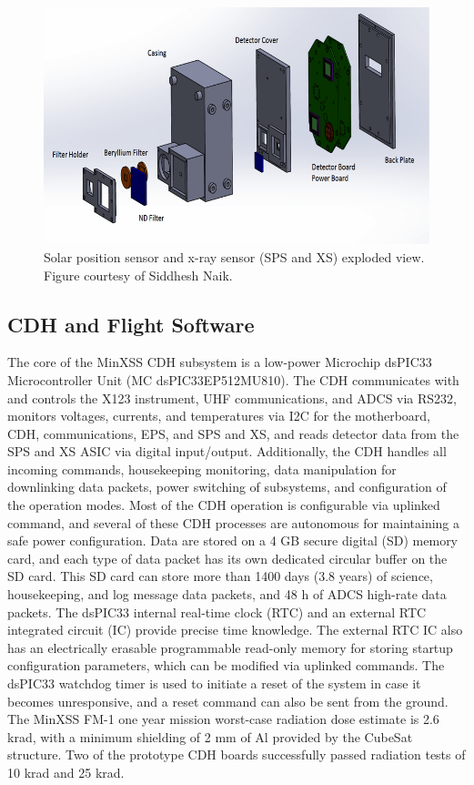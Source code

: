 \begin{figure}[!h]
    \begin{center}
	    \includegraphics[width=\textwidth]{Images/SpsExploded.png}
    \end{center}
    \caption[SPS and XS exploded view]{
        Solar position sensor and x-ray sensor (SPS and XS) exploded view. Figure courtesy of Siddhesh Naik. 
    }
    \label{fig:spsexploded}
\end{figure}

\subsection{CDH and Flight Software}
The core of the MinXSS CDH subsystem is a low-power Microchip dsPIC33 Microcontroller Unit (MC dsPIC33EP512MU810). The CDH communicates with and controls the X123 instrument, UHF communications, and ADCS via RS232, monitors voltages, currents, and temperatures via I2C for the motherboard, CDH, communications, EPS, and SPS and XS, and reads detector data from the SPS and XS ASIC via digital input/output. Additionally, the CDH handles all incoming commands, housekeeping monitoring, data manipulation for downlinking data packets, power switching of subsystems, and configuration of the operation modes. Most of the CDH operation is configurable via uplinked command, and several of these CDH processes are autonomous for maintaining a safe power configuration. Data are stored on a 4 GB secure digital (SD) memory card, and each type of data packet has its own dedicated circular buffer on the SD card. This SD card can store more than 1400 days (3.8 years) of science, housekeeping, and log message data packets, and 48 h of ADCS high-rate data packets. The dsPIC33 internal real-time clock (RTC) and an external RTC integrated circuit (IC) provide precise time knowledge. The external RTC IC also has an electrically erasable programmable read-only memory for storing startup configuration parameters, which can be modified via uplinked commands. The dsPIC33 watchdog timer is used to initiate a reset of the system in case it becomes unresponsive, and a reset command can also be sent from the ground. The MinXSS FM-1 one year mission worst-case radiation dose estimate is 2.6 krad, with a minimum shielding of 2 mm of Al provided by the CubeSat structure. Two of the prototype CDH boards successfully passed radiation tests of 10 krad and 25 krad.

